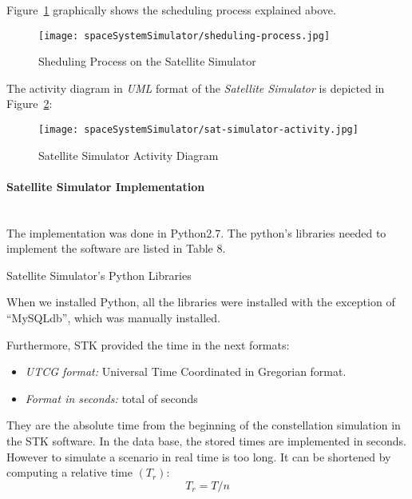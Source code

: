 Figure~\ref{fig:sss-sheduling-process} graphically shows the scheduling process explained above.


\begin{figure}[!h]
\begin{center}
\texttt{[image: spaceSystemSimulator/sheduling-process.jpg]}
\caption{Sheduling Process on the Satellite Simulator}
\label{fig:sss-sheduling-process}
\end{center}
\end{figure}


The activity diagram in \emph{UML} format of the \emph{Satellite Simulator} is
depicted in Figure~\ref{fig:sss-satellite-activity}:

\begin{figure}[!h]
\begin{center}
\texttt{[image: spaceSystemSimulator/sat-simulator-activity.jpg]}
\caption{Satellite Simulator Activity Diagram}
\label{fig:sss-satellite-activity}
\end{center}
\end{figure}

\paragraph{Satellite Simulator Implementation}
\label{par:sat-simulator-implementation}~\\

The implementation was done in Python2.7. The python's libraries needed to
implement the software are listed in Table 8.



\begin{table}[hp]
  \centering
  {\small
  
  }
  \caption{Satellite Simulator's Python Libraries}
  \label{table:sss-satellite-libraries}
\end{table}

When we installed Python, all the libraries were installed with the exception of ``MySQLdb'', which was manually installed.

Furthermore, STK provided the time in the next formats:
\begin{itemize}
\item \emph{UTCG format:} Universal Time Coordinated in Gregorian format.
\item \emph{Format in seconds:} total of seconds
\end{itemize}
They are the absolute time from the beginning of the constellation simulation in
the STK software. In the data base, the stored times are implemented in
seconds. However to simulate a scenario in real time is too long. It can be
shortened by computing a relative time $(T_r)$:
\begin{equation}\label{eq:TR}
	T_r=T/n
\end{equation}

